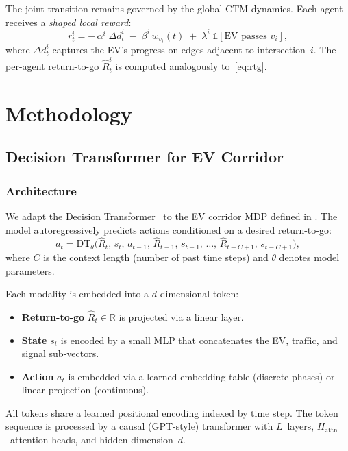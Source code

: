 \documentclass[journal]{IEEEtran}
\newcommand{\R}{\mathbb{R}}
\newcommand{\Rtg}{\widehat{R}}
\begin{document}
The joint transition remains governed by the global CTM dynamics.
Each agent receives a \emph{shaped local reward}:
\begin{equation}
  r_t^i =
    -\,\alpha^i\;\Delta d_t^{i}\;
    -\;\beta^i \, w_{v_i}(t)\;
    +\;\lambda^i\;\mathbb{1}[\text{EV passes } v_i],
  \label{eq:local_reward}
\end{equation}
where $\Delta d_t^{i}$ captures the EV's progress on edges adjacent to
intersection~$i$.  The per-agent return-to-go $\Rtg_t^i$ is computed
analogously to~\eqref{eq:rtg}.

\section{Methodology}
\label{sec:method}

\subsection{Decision Transformer for EV Corridor}
\label{sec:method:dt}

\subsubsection{Architecture}
We adapt the Decision Transformer~\cite{chen2021decision} to the EV
corridor MDP defined in .  The model
autoregressively predicts actions conditioned on a desired
return-to-go:
\begin{equation}
  a_t = \text{DT}_\theta\!\bigl(
    \Rtg_t,\, s_t,\, a_{t-1},\,
    \Rtg_{t-1},\, s_{t-1},\, \ldots,\,
    \Rtg_{t-C+1},\, s_{t-C+1}
  \bigr),
  \label{eq:dt}
\end{equation}
where $C$ is the context length (number of past time steps) and
$\theta$ denotes model parameters.

Each modality is embedded into a $d$-dimensional token:
\begin{itemize}
  \item \textbf{Return-to-go} $\Rtg_t \in \R$ is projected via a
    linear layer.
  \item \textbf{State} $s_t$ is encoded by a small MLP that
    concatenates the EV, traffic, and signal sub-vectors.
  \item \textbf{Action} $a_t$ is embedded via a learned embedding
    table (discrete phases) or linear projection (continuous).
\end{itemize}
All tokens share a learned positional encoding indexed by time step.
The token sequence is processed by a causal (GPT-style) transformer
with $L$~layers, $H_{\text{attn}}$~attention heads, and hidden
dimension~$d$.
\end{document}
